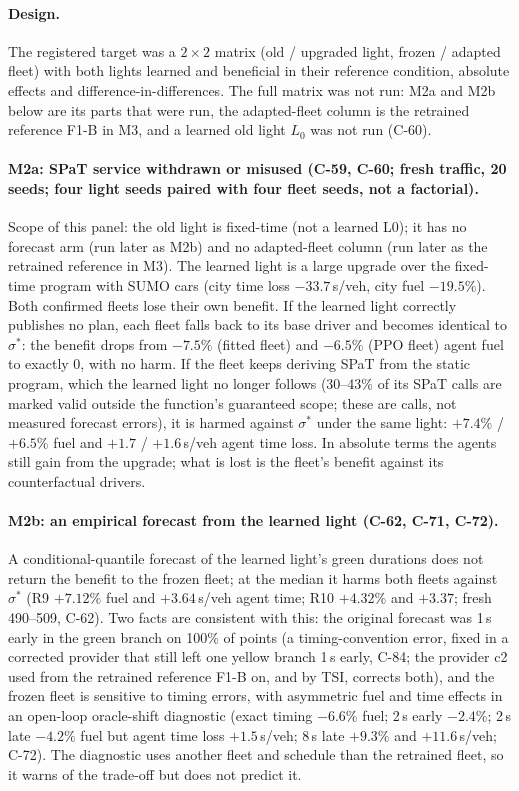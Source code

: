 \documentclass[11pt]{article}
\begin{document}
\paragraph{Design.} The registered target was a $2\times2$ matrix (old / upgraded light, frozen / adapted fleet) with both lights learned and
beneficial in their reference condition, absolute effects and difference-in-differences. The full matrix was not run: M2a and M2b below are
its parts that were run, the adapted-fleet column is the retrained reference F1-B in M3, and a learned old light $L_0$ was not run (C-60).
\paragraph{M2a: SPaT service withdrawn or misused (C-59, C-60; fresh traffic, 20 seeds; four light seeds paired with four fleet
seeds, not a factorial).} Scope of this panel: the old light is fixed-time (not a learned L0); it has no forecast arm (run later as M2b)
and no adapted-fleet column (run later as the retrained reference in M3). The learned light is a large
upgrade over the fixed-time program with SUMO cars (city time loss $-33.7$\,s/veh, city fuel $-19.5\%$). Both confirmed fleets lose their
own benefit. If the learned light correctly publishes no plan, each fleet falls back to its base driver and becomes identical to
$\sigma^*$: the benefit drops from $-7.5\%$ (fitted fleet) and $-6.5\%$ (PPO fleet) agent fuel to exactly 0, with no harm. If the fleet
keeps deriving SPaT from the static program, which the learned light no longer follows (30--43\% of its SPaT calls are marked valid
outside the function's guaranteed scope; these are calls, not measured forecast errors), it is harmed against $\sigma^*$ under the same light: $+7.4\%$ / $+6.5\%$ fuel and $+1.7$ / $+1.6$\,s/veh agent time loss. In
absolute terms the agents still gain from the upgrade; what is lost is the fleet's benefit against its counterfactual drivers.
\paragraph{M2b: an empirical forecast from the learned light (C-62, C-71, C-72).} A conditional-quantile forecast of the learned light's
green durations does not return the benefit to the frozen fleet; at the median it harms both fleets against $\sigma^*$ (R9 $+7.12\%$ fuel and
$+3.64$\,s/veh agent time; R10 $+4.32\%$ and $+3.37$; fresh 490--509, C-62). Two facts are consistent with this: the original forecast was 1\,s early in
the green branch on 100\% of points (a timing-convention error, fixed in a corrected provider that still left one yellow branch 1\,s early, C-84; the provider c2 used from
the retrained reference F1-B on, and by TSI, corrects both),
and the frozen fleet is sensitive to timing errors, with asymmetric fuel and time effects in an open-loop oracle-shift diagnostic (exact
timing $-6.6\%$ fuel; 2\,s early $-2.4\%$; 2\,s late $-4.2\%$ fuel but agent time loss $+1.5$\,s/veh; 8\,s late $+9.3\%$ and $+11.6$\,s/veh;
C-72). The diagnostic uses another fleet and schedule than the retrained fleet, so it warns of the trade-off but does not predict it.
\end{document}
